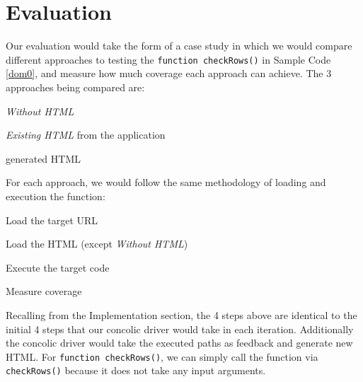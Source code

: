 \section{Evaluation}
Our evaluation would take the form of a case study in which we would compare different approaches to testing the {\tt function checkRows()} in Sample Code \ref{dom0}, and measure how much coverage each approach can achieve.
The 3 approaches being compared are:
\begin{compactitem}
\item {\em Without HTML}
\item {\em Existing HTML} from the application
\item \tool generated HTML
\end{compactitem}

For each approach, we would follow the same methodology of loading and execution the function:
\begin{compactitem}
\item Load the target URL
\item Load the HTML (except {\em Without HTML})
\item Execute the target code
\item Measure coverage
\end{compactitem}
Recalling from the Implementation section, the 4 steps above are identical to the initial 4 steps that our concolic driver would take in each iteration.  Additionally the concolic driver would take the executed paths as feedback and generate new HTML.  
For {\tt function checkRows()}, we can simply call the function via {\tt checkRows()} because it does not take any input arguments.

